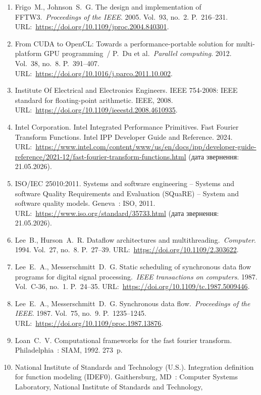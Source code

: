 \documentclass[
]{article}
\begin{document}
\begin{enumerate}
  FFTW. FFTW Home Page. Awards. URL:~\url{https://www.fftw.org/} (дата
  звернення: 21.05.2026).
\item
  Frigo~M., Johnson~S.~G. The design and implementation of
  FFTW3.~\emph{Proceedings of the IEEE}. 2005. Vol.~93, no.~2.
  P.~216--231. URL:~\url{https://doi.org/10.1109/jproc.2004.840301}.
\item
  From CUDA to OpenCL: Towards a performance-portable solution for
  multi-platform GPU programming~/ P.~Du et al.~\emph{Parallel
  computing}. 2012. Vol.~38, no.~8. P.~391--407.
  URL:~\url{https://doi.org/10.1016/j.parco.2011.10.002}.
\item
  Institute Of Electrical and Electronics Engineers. IEEE 754-2008: IEEE
  standard for floating-point arithmetic. IEEE, 2008.
  URL:~\url{https://doi.org/10.1109/ieeestd.2008.4610935}.
\item
  Intel Corporation. Intel Integrated Performance Primitives. Fast
  Fourier Transform Functions. Intel IPP Developer Guide and Reference.
  2024.
  URL:~\url{https://www.intel.com/content/www/us/en/docs/ipp/developer-guide-reference/2021-12/fast-fourier-transform-functions.html}
  (дата звернення: 21.05.2026).
\item
  ISO/IEC 25010:2011. Systems and software engineering -- Systems and
  software Quality Requirements and Evaluation (SQuaRE) -- System and
  software quality models. Geneva~: ISO, 2011.
  URL:~\url{https://www.iso.org/standard/35733.html} (дата звернення:
  21.05.2026).
\item
  Lee~B., Hurson~A.~R. Dataflow architectures and
  multithreading.~\emph{Computer}. 1994. Vol.~27, no.~8. P.~27--39.
  URL:~\url{https://doi.org/10.1109/2.303622}.
\item
  Lee~E.~A., Messerschmitt~D.~G. Static scheduling of synchronous data
  flow programs for digital signal processing.~\emph{IEEE transactions
  on computers}. 1987. Vol.~C-36, no.~1. P.~24--35.
  URL:~\url{https://doi.org/10.1109/tc.1987.5009446}.
\item
  Lee~E.~A., Messerschmitt~D.~G. Synchronous data
  flow.~\emph{Proceedings of the IEEE}. 1987. Vol.~75, no.~9.
  P.~1235--1245. URL:~\url{https://doi.org/10.1109/proc.1987.13876}.
\item
  Loan~C.~V. Computational frameworks for the fast fourier transform.
  Philadelphia~: SIAM, 1992. 273~p.
\item
  National Institute of Standards and Technology (U.S.). Integration
  definition for function modeling (IDEF0). Gaithersburg, MD~: Computer
  Systems Laboratory, National Institute of Standards and Technology,

\end{enumerate}
\end{document}
